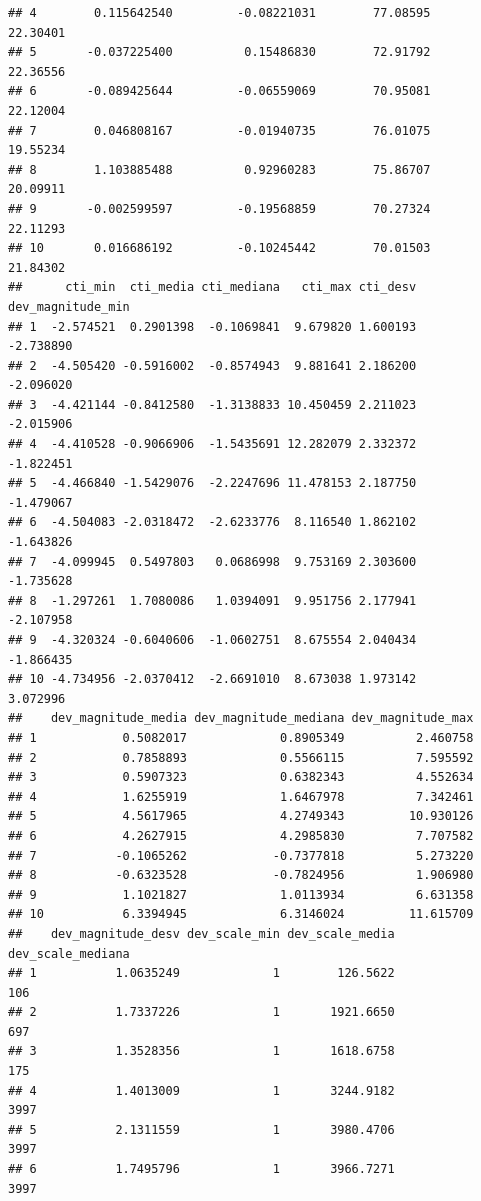 \documentclass[11pt,]{article}
\begin{document}
\begin{verbatim}
## 4        0.115642540         -0.08221031        77.08595         22.30401
## 5       -0.037225400          0.15486830        72.91792         22.36556
## 6       -0.089425644         -0.06559069        70.95081         22.12004
## 7        0.046808167         -0.01940735        76.01075         19.55234
## 8        1.103885488          0.92960283        75.86707         20.09911
## 9       -0.002599597         -0.19568859        70.27324         22.11293
## 10       0.016686192         -0.10245442        70.01503         21.84302
##      cti_min  cti_media cti_mediana   cti_max cti_desv dev_magnitude_min
## 1  -2.574521  0.2901398  -0.1069841  9.679820 1.600193         -2.738890
## 2  -4.505420 -0.5916002  -0.8574943  9.881641 2.186200         -2.096020
## 3  -4.421144 -0.8412580  -1.3138833 10.450459 2.211023         -2.015906
## 4  -4.410528 -0.9066906  -1.5435691 12.282079 2.332372         -1.822451
## 5  -4.466840 -1.5429076  -2.2247696 11.478153 2.187750         -1.479067
## 6  -4.504083 -2.0318472  -2.6233776  8.116540 1.862102         -1.643826
## 7  -4.099945  0.5497803   0.0686998  9.753169 2.303600         -1.735628
## 8  -1.297261  1.7080086   1.0394091  9.951756 2.177941         -2.107958
## 9  -4.320324 -0.6040606  -1.0602751  8.675554 2.040434         -1.866435
## 10 -4.734956 -2.0370412  -2.6691010  8.673038 1.973142          3.072996
##    dev_magnitude_media dev_magnitude_mediana dev_magnitude_max
## 1            0.5082017             0.8905349          2.460758
## 2            0.7858893             0.5566115          7.595592
## 3            0.5907323             0.6382343          4.552634
## 4            1.6255919             1.6467978          7.342461
## 5            4.5617965             4.2749343         10.930126
## 6            4.2627915             4.2985830          7.707582
## 7           -0.1065262            -0.7377818          5.273220
## 8           -0.6323528            -0.7824956          1.906980
## 9            1.1021827             1.0113934          6.631358
## 10           6.3394945             6.3146024         11.615709
##    dev_magnitude_desv dev_scale_min dev_scale_media dev_scale_mediana
## 1           1.0635249             1        126.5622               106
## 2           1.7337226             1       1921.6650               697
## 3           1.3528356             1       1618.6758               175
## 4           1.4013009             1       3244.9182              3997
## 5           2.1311559             1       3980.4706              3997
## 6           1.7495796             1       3966.7271              3997

\end{verbatim}
\end{document}
